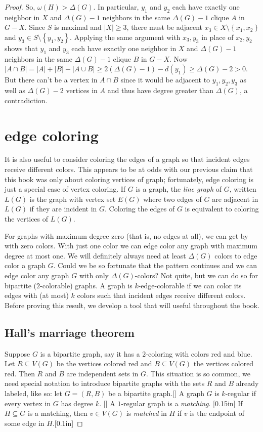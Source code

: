 \documentclass{amsbook}
\newcommand{\aaside}[2]{\marginnote{\scriptsize{#1}}[#2]}
\theoremstyle{plain}
\numberwithin{equation}{chapter}
\newcommand{\set}[1]{\left\{ #1 \right\}}
\newcommand{\card}[1]{\left|#1\right|}
\begin{document}
\begin{proof}
So, $\omega(H) > \Delta(G)$.  In particular, $y_1$ and $y_2$ each have exactly one neighbor in $X$ and $\Delta(G) - 1$ neighbors in the same $\Delta(G) -1$ clique $A$ in $G - X$.
 Since $S$ is maximal and $\card{X} \ge 3$, there must be adjacent
$x_3 \in X \setminus \set{x_1,x_2}$ and $y_3 \in S \setminus \set{y_1,y_2}$.  Applying the same argument with $x_3, y_3$ in place of $x_2, y_2$ shows
that $y_1$ and $y_3$ each have exactly one neighbor in $X$ and $\Delta(G) - 1$ neighbors in the same $\Delta(G) -1$ clique $B$ in $G - X$.
Now $\card{A\cap B} = \card{A} + \card{B} - \card{A\cup B} \ge 2(\Delta(G) - 1) - d(y_1) \ge \Delta(G) - 2 > 0$.  But there can't be a vertex
in $A \cap B$ since it would be adjacent to $y_1,y_2,y_3$ as well as $\Delta(G) - 2$ vertices in $A$ and thus have degree greater than $\Delta(G)$, a contradiction. 

\chapter*{edge coloring}
It is also useful to consider coloring the edges of a graph so that incident edges receive different colors.  This
appears to be at odds with our previous claim that this book was only about coloring vertices of graph; fortunately, edge coloring
is just a special case of vertex coloring.  If $G$ is a graph, the \emph{line graph} of $G$, written
$L(G)$ is the graph with vertex set $E(G)$ where two edges of $G$ are adjacent in $L(G)$ if they are incident in $G$.  Coloring
the edges of $G$ is equivalent to coloring the vertices of $L(G)$.

For graphs with maximum degree zero (that is, no edges at all), we can get by with zero colors.  
With just one color we can edge color any graph with maximum degree at most one.  We will definitely always need at least $\Delta(G)$ colors
to edge color a graph $G$.  Could we be so fortunate that the pattern continues
and we can edge color any graph $G$ with only $\Delta(G)$-colors? Not quite, but we can do so for bipartite ($2$-colorable) graphs.
A graph is $k$-edge-colorable if we can color its edges with (at most) $k$ colors such that incident edges receive different colors.
Before proving this result, we develop a tool that will useful throughout the book.

\section*{Hall's marriage theorem}
Suppose $G$ is a bipartite graph, say it has a $2$-coloring with colors red and blue.  Let $R \subseteq V(G)$ be the vertices colored red and
$B \subseteq V(G)$ the vertices colored red.  Then $R$ and $B$ are independent sets in $G$.  This situation is so common, we need special notation
to introduce bipartite graphs with the sets $R$ and $B$ already labeled, like so: let $G = (R,B)$ be a bipartite graph.\aaside{$G = (R,B)$}{}
A graph $G$ is $k$-regular if every vertex in $G$ has degree $k$. \aaside{$k$-regular}{} A $1$-regular graph is a \emph{matching}. \aaside{matching}{0.15in} If $H \subseteq G$ is a matching, then
$v \in V(G)$ is \emph{matched} in $H$ if $v$ is the endpoint of some edge in $H$.\aaside{matched}{0.1in}


\end{proof}
\end{document}
